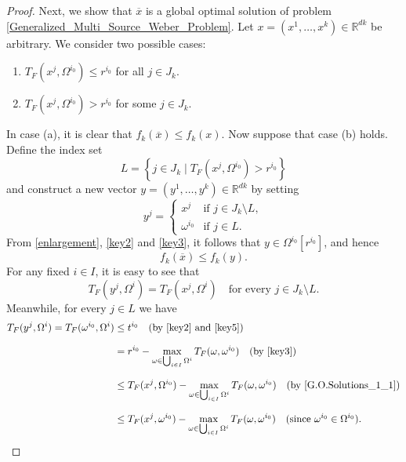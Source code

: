 \documentclass[sn-mathphys-num]{sn-jnl}%
\theoremstyle{definition}
\begin{document}
\begin{proof}
	Next, we show that \( \overline{x} \) is a global optimal solution of problem \eqref{Generalized_Multi_Source_Weber_Problem}. Let \( x = (x^1,\dots, x^k) \in \mathbb{R}^{dk} \) be arbitrary. We consider two possible cases:
	\begin{enumerate}
		\item [(a)] \( T_F(x^j,\Omega^{i_0}) \leq r^{i_0} \) for all \( j\in J_k\). 
		\item [(b)]\( T_F(x^{j},\Omega^{i_0}) > r^{i_0} \) for some \( j \in J_k \).
	\end{enumerate}    
	In case (a), it is clear that $	f_k(\overline{x}) \leq f_k(x).$ Now suppose that case (b) holds.  Define the index set
	\begin{equation}
		\label{G.O.Solutions_1_1}
		L = \left\{j \in J_k \mid T_F(x^j,\Omega^{i_0}) > r^{i_0}\right\}
	\end{equation} 
	and construct a new vector $ y = (y^1,\dots,y^k) \in \mathbb{R}^{dk} $ by setting
	\begin{equation}\label{key5}
		y^j = \begin{cases}
			x^j  & \text{if } j \in J_k \setminus L,\\
			\omega^{i_0}  & \text{if } j \in L.
		\end{cases}  
	\end{equation}
	From \eqref{enlargement}, \eqref{key2} and \eqref{key3}, it follows that 
	$ y \in \Omega^{i_0}[r^{i_0}]$, and hence \begin{equation}\label{key66}
		f_k(\overline{x}) \leq f_k(y).
	\end{equation}
	For any fixed \( i \in I \), it is easy to see that 
	\begin{equation}\label{G.O.Solutions_1_2}
		T_F(y^j,\Omega^i) = T_F(x^j,\Omega^i) \quad \text{for every } j \in J_k \setminus L.
	\end{equation}
	Meanwhile, for every \( j \in L \) we have
	\[ \begin{aligned}
		T_F(y^j,\Omega^i) = T_F(\omega^{i_0},\Omega^i) 
		&\leq t^{i_0}\quad(\text{by \eqref{key2} and \eqref{key5})}\\[0.1in]
		&= r^{i_0} - \max_{\omega \in \bigcup_{i \in I} \Omega^i} T_F(\omega,\omega^{i_0}) \quad(\text{by \eqref{key3})} \\[0.1in]
		&\leq T_F(x^j,\Omega^{i_0}) - \max_{\omega \in \bigcup_{i \in I} \Omega^i} T_F(\omega,\omega^{i_0})\quad (\text{by \eqref{G.O.Solutions_1_1}})\\[0.1in]
		&\leq T_F(x^j,\omega^{i_0}) -  \max_{\omega \in \bigcup_{i \in I} \Omega^i} T_F(\omega,\omega^{i_0})\quad(\text{since }\omega^{i_0}\in \Omega^{i_0} ). 

\end{aligned}\]
\end{proof}
\end{document}
